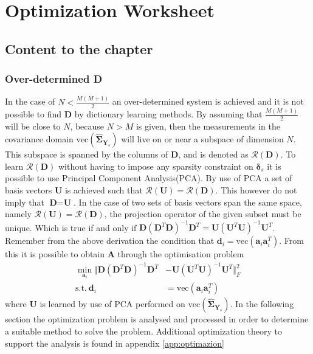 \chapter*{Optimization Worksheet}
\section{Content to the chapter}
\subsection{Over-determined \textbf{D}}
In the case of $N < \frac{M(M+1)}{2}$ an over-determined system is achieved and it is not possible to find $\textbf{D}$ by dictionary learning methods.
By assuming that $\frac{M(M+1)}{2}$ will be close to $N$, because $N > M$ is given, then the measurements in the covariance domain $\text{vec}(\widehat{\boldsymbol{\Sigma}}_{\textbf{Y}_s})$ will live on or near a subspace of dimension $N$. 
This subspace is spanned by the columns of $\textbf{D}$, and is denoted as $\mathcal{R}(\textbf{D})$. 
To learn $\mathcal{R}(\textbf{D})$ without having to impose any sparsity constraint on $\boldsymbol{\delta}_s$ it is possible to use Principal Component Analysis(PCA). 
By use of PCA a set of basis vectors $\textbf{U}$ is achieved such that $\mathcal{R}(\textbf{U})=\mathcal{R}(\textbf{D})$. 
This however do not imply that $\textbf{D}=\textbf{U}$. 
In the case of two sets of basis vectors span the same space, namely $\mathcal{R}(\textbf{U})=\mathcal{R}(\textbf{D})$, the projection operator of the given subset must be unique. 
Which is true if and only if $\textbf{D}(\textbf{D}^T\textbf{D})^{-1}\textbf{D}^T=\textbf{U}(\textbf{U}^T\textbf{U})^{-1}\textbf{U}^T$. 
Remember from the above derivation the condition that $\textbf{d}_i = \text{vec}(\textbf{a}_i\textbf{a}_i^T)$. 
From this it is possible to obtain $\textbf{A}$ through the optimisation problem 
\begin{align}
\min_{\textbf{a}_i}\Vert  \textbf{D}(\textbf{D}^T\textbf{D})^{-1}\textbf{D}^T &- \textbf{U}(\textbf{U}^T\textbf{U})^{-1}\textbf{U}^T \Vert_{F}^{2} \nonumber \\
\text{s.t.} \ \textbf{d}_i&=\text{vec}(\textbf{a}_i\textbf{a}_i^T)\label{eq:Cov_DL2}
\end{align}      
where $\textbf{U}$ is learned by use of PCA performed on $\text{vec}(\widehat{\boldsymbol{\Sigma}}_{\textbf{Y}_s})$.
In the following section the optimization problem is analysed and processed in order to determine a suitable method to solve the problem. Additional optimization theory to support the analysis is found in appendix \ref{app:optimazion}  


